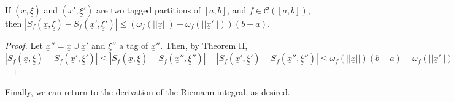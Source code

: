 \begin{theorem}
    If $(\underline{x}, \underline{\xi})$ and $(\underline{x}', \underline{\xi}')$ are two tagged partitions of $[a,b]$, and $f \in \mathcal{C}([a,b])$, then $|S_f(\underline{x}, \underline{\xi}) - S_f(\underline{x}', \underline{\xi}')| \leq (\omega_f(||\underline{x}||) + \omega_f(||\underline{x}'||))(b-a)$.
\end{theorem}

\begin{proof}
    Let $\underline{x}'' = \underline{x} \cup \underline{x}'$ and $\underline{\xi}''$ a tag of $\underline{x}''$. Then, by Theorem II, $|S_f(\underline{x}, \underline{\xi}) - S_f(\underline{x}', \underline{\xi}')| \leq |S_f(\underline{x}, \underline{\xi}) - S_f(\underline{x}'', \underline{\xi}'')| - |S_f(\underline{x}', \underline{\xi}') - S_f(\underline{x}'', \underline{\xi}'')| \leq \omega_f(||\underline{x}||)(b-a) + \omega_f(||\underline{x}'||)(b-a)$
\end{proof}

Finally, we can return to the derivation of the Riemann integral, as desired.

